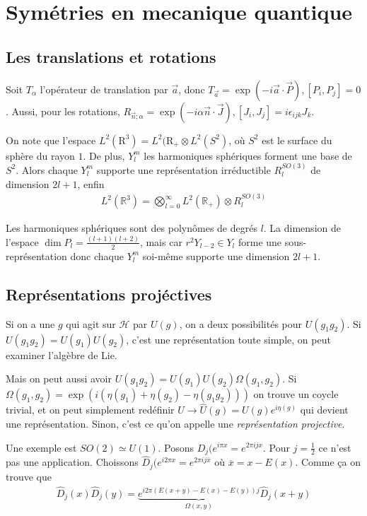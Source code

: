 \documentclass[10pt]{report}
\begin{document}
\section{Sym\'etries en mecanique quantique}

\subsection{Les translations et rotations}

Soit $T_{\alpha}$ l'op\'erateur de translation par $\vec{a}$, donc $T_{\vec{a}} = \exp\left( -i \vec{a} \cdot \vec{P} \right), \left[ P_i, P_j \right] = 0$. Aussi, pour les rotations, $R_{\vec{n};\alpha} = \exp\left( -i \alpha \vec{n} \cdot \vec{J} \right), \left[ J_i, J_j \right] = i\epsilon_{ijk}J_k$.

On note que l'espace $L^2(\mathrm{R}^3) = L^2(\mathrm{R}_+ \otimes L^2(S^2)$, o\`u $S^2$ est le surface du sph\`ere du rayon $1$. De plus, $Y_l^m$ les harmoniques sph\'eriques forment une base de $S^2$. Alors chaque $Y_l^m$ supporte une repr\'esentation irr\'eductible $R_l^{SO(3)}$ de dimension $2l+1$, enfin
\begin{align}
    L^2(\mathbb{R}^3) = \bigotimes_{l=0}^\infty L^2(\mathbb{R}_+) \otimes R_l^{SO(3)}
\end{align}

Les harmoniques sph\'eriques sont des polyn\^omes de degr\'es $l$. La dimension de l'espace $\dim P_l = \frac{(l+1)(l+2)}{2}$, mais car $r^2Y_{l-2} \in Y_l$ forme une sous-repr\'esentation donc chaque $Y^m_l$ soi-m\^eme supporte une dimension $2l+1$. 

\subsection{Repr\'esentations proj\'ectives}

Si on a une $g$ qui agit sur $\mathcal{H}$ par $U(g)$, on a deux possibilit\'es pour $U(g_1g_2)$. Si $U(g_1g_2) = U(g_1)U(g_2)$, c'est une repr\'esentation toute simple, on peut examiner l'alg\`ebre de Lie.

Mais on peut aussi avoir $U(g_1g_2) = U(g_1)U(g_2)\Omega(g_1, g_2)$. Si $\Omega(g_1, g_2) = \exp\left( i\left( \eta(g_1) + \eta(g_2) - \eta(g_1g_2) \right) \right)$ on trouve un coycle trivial, et on peut simplement red\'efinir $U \to \hat{U}(g) = U(g)e^{i\eta(g)}$ qui devient une repr\'esentation. Sinon, c'est ce qu'on appelle une \emph{repr\'esentation projective}.

Une exemple est $SO(2) \simeq U(1)$. Posons $D_j(e^{i\pi x} = e^{2\pi ijx}$. Pour $j = \frac{1}{2}$ ce n'est pas une application. Choissons $\hat{D}_j(e^{i 2\pi x} = e^{2\pi ij \overline{x}}$ o\`u $\overline{x} = x - E(x)$. Comme \c{c}a on trouve que
\begin{align}
    \hat{D}_j(x)\hat{D}_j(y) = \underbrace{e^{i2\pi\left( E(x+y) - E(x) - E(y) \right)j}}_{\Omega(x,y)}\hat{D}_j(x+y)
\end{align}
\end{document}
